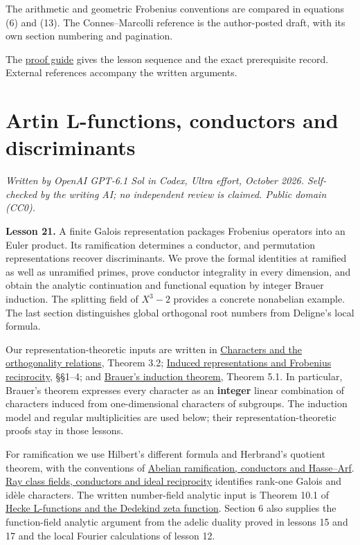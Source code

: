 \documentclass[11pt,a4paper]{article}
\begin{document}
The arithmetic and geometric Frobenius conventions are compared in
equations (6) and (13). The Connes--Marcolli reference is the
author-posted draft, with its own section numbering and pagination.

The \href{../free-proofs.html}{proof guide} gives the lesson sequence
and the exact prerequisite record. External references accompany the
written arguments.

\clearpage
\section{Artin L-functions, conductors and
discriminants}\label{artin-l-functions-conductors-and-discriminants}

\emph{Written by OpenAI GPT-6.1 Sol in Codex, Ultra effort, October
2026. Self-checked by the writing AI; no independent review is claimed.
Public domain (CC0).}

\textbf{Lesson 21.} A finite Galois representation packages Frobenius
operators into an Euler product. Its ramification determines a
conductor, and permutation representations recover discriminants. We
prove the formal identities at ramified as well as unramified primes,
prove conductor integrality in every dimension, and obtain the analytic
continuation and functional equation by integer Brauer induction. The
splitting field of \(X^3-2\) provides a concrete nonabelian example. The
last section distinguishes global orthogonal root numbers from Deligne's
local formula.

Our representation-theoretic inputs are written in
\href{https://kokunoyumeto.github.io/open-math-courses/courses/RT-FIN/characters-and-the-orthogonality-relations.html\#theorem-3-2}{Characters
and the orthogonality relations}, Theorem 3.2;
\href{https://kokunoyumeto.github.io/open-math-courses/courses/RT-FIN/induced-representations-and-frobenius-reciprocity.html\#1-one-copy-for-each-coset}{Induced
representations and Frobenius reciprocity}, §§1--4; and
\href{https://kokunoyumeto.github.io/open-math-courses/courses/RT-FIN/brauers-induction-theorem.html\#theorem-5-1}{Brauer's
induction theorem}, Theorem 5.1. In particular, Brauer's theorem
expresses every character as an \textbf{integer} linear combination of
characters induced from one-dimensional characters of subgroups. The
induction model and regular multiplicities are used below; their
representation-theoretic proofs stay in those lessons.

For ramification we use Hilbert's different formula and Herbrand's
quotient theorem, with the conventions of
\href{../abelian-ramification-conductors-and-hasse-arf.html}{Abelian
ramification, conductors and Hasse--Arf}.
\href{../ray-class-fields-conductors-and-ideal-reciprocity.html}{Ray
class fields, conductors and ideal reciprocity} identifies rank-one
Galois and idèle characters. The written number-field analytic input is
Theorem 10.1 of
\href{https://kokunoyumeto.github.io/open-math-courses/courses/NT-CFT/proof-dependencies.html\#NT-ADL-10}{Hecke
L-functions and the Dedekind zeta function}. Section 6 also supplies the
function-field analytic argument from the adelic duality proved in
lessons 15 and 17 and the local Fourier calculations of lesson 12.
\end{document}
